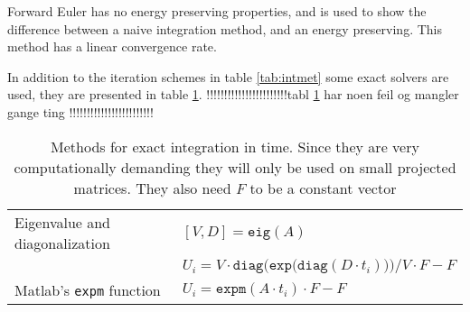 Forward Euler has no energy preserving properties, and is used to show the difference between a naive integration method, and an energy preserving. This method has a linear convergence rate.

In addition to the iteration schemes in table \ref{tab:intmet} some exact solvers are used, they are presented in table \ref{tab:intcorrect}.
!!!!!!!!!!!!!!!!!!!!!!!tabl \ref{tab:intcorrect} har noen feil og mangler gange ting !!!!!!!!!!!!!!!!!!!!!!!!\\
\begin{table}
\begin{tabular}{l l}
Eigenvalue and diagonalization & $[V,D] = \texttt{eig}(A)$ \\
 & $U_i = V \cdot \texttt{diag} \Big( \texttt{exp} \big( \texttt{diag}(D \cdot t_i)\big)\Big)/V \cdot F - F$ \\
Matlab's \texttt{expm} function & $U_i = \texttt{expm}(A \cdot t_i) \cdot F - F$ \\

\end{tabular}
\caption{Methods for exact integration in time. Since they are very computationally demanding they will only be used on small projected matrices. They also need $F$ to be a constant vector}
\label{tab:intcorrect} 
\end{table}

